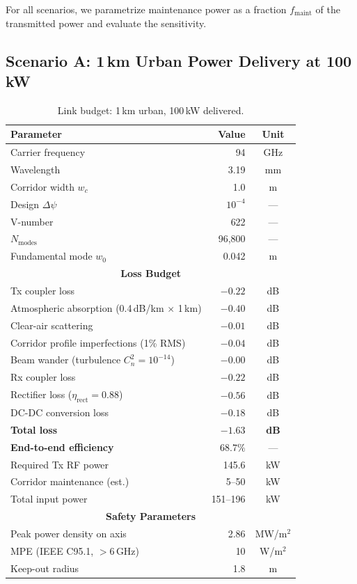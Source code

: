 \documentclass[journal,twocolumn]{IEEEtran}
\begin{document}
For all scenarios, we parametrize maintenance power as a fraction
$f_\text{maint}$ of the transmitted power and evaluate the sensitivity.

\subsection{Scenario A: 1\,km Urban Power Delivery at 100\,kW}

\begin{table}[h]
\caption{Link budget: 1\,km urban, 100\,kW delivered.}
\label{tab:link_A}
\centering
\begin{tabular}{lrc}
\toprule
Parameter & Value & Unit \\
\midrule
Carrier frequency & 94 & GHz \\
Wavelength & 3.19 & mm \\
Corridor width $w_c$ & 1.0 & m \\
Design $\Delta\psi$ & $10^{-4}$ & --- \\
V-number & 622 & --- \\
$N_\text{modes}$ & 96,800 & --- \\
Fundamental mode $w_0$ & 0.042 & m \\
\midrule
\multicolumn{3}{c}{\textbf{Loss Budget}} \\
\midrule
Tx coupler loss & $-0.22$ & dB \\
Atmospheric absorption (0.4\,dB/km $\times$ 1\,km) & $-0.40$ & dB \\
Clear-air scattering & $-0.01$ & dB \\
Corridor profile imperfections (1\% RMS) & $-0.04$ & dB \\
Beam wander (turbulence $C_n^2 = 10^{-14}$) & $-0.00$ & dB \\
Rx coupler loss & $-0.22$ & dB \\
Rectifier loss ($\eta_\text{rect} = 0.88$) & $-0.56$ & dB \\
DC-DC conversion loss & $-0.18$ & dB \\
\midrule
\textbf{Total loss} & $\mathbf{-1.63}$ & \textbf{dB} \\
\textbf{End-to-end efficiency} & $\mathbf{68.7\%}$ & --- \\
\midrule
Required Tx RF power & 145.6 & kW \\
Corridor maintenance (est.) & 5--50 & kW \\
Total input power & 151--196 & kW \\
\midrule
\multicolumn{3}{c}{\textbf{Safety Parameters}} \\
\midrule
Peak power density on axis & 2.86 & MW/m$^2$ \\
MPE (IEEE C95.1, $>$6\,GHz) & 10 & W/m$^2$ \\
Keep-out radius & 1.8 & m \\
\bottomrule
\end{tabular}
\end{table}
\end{document}
